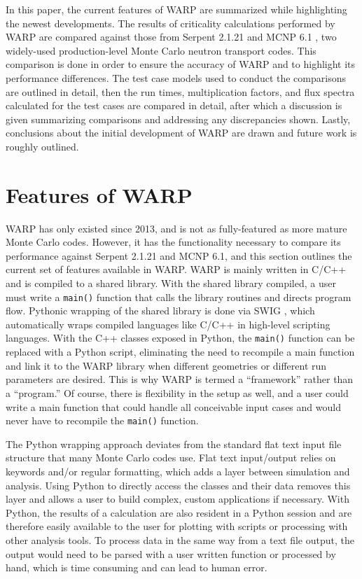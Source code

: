 \documentclass[preprint,12pt]{elsarticle}
\begin{document}
In this paper, the current features of WARP are summarized while highlighting the newest developments.  The results of criticality calculations performed by WARP are compared against those from Serpent 2.1.21 \cite{jaakko,serpent} and MCNP 6.1 \cite{mcnp6}, two widely-used production-level Monte Carlo neutron transport codes.   This comparison is done in order to ensure the accuracy of WARP and to highlight its performance differences.  The test case models used to conduct the comparisons are outlined in detail, then the run times, multiplication factors, and flux spectra calculated for the test cases are compared in detail, after which a discussion is given summarizing comparisons and addressing any discrepancies shown.  Lastly, conclusions about the initial development of WARP are drawn and future work is roughly outlined.

\section{Features of WARP}
\label{sec:features}

WARP has only existed since 2013, and is not as fully-featured as more mature Monte Carlo codes.  However, it has the functionality necessary to compare its performance against Serpent 2.1.21 and MCNP 6.1, and this section outlines the current set of features available in WARP.  WARP is mainly written in C/C++ and is compiled to a shared library.  With the shared library compiled, a user must write a \texttt{main()} function that calls the library routines and directs program flow.  Pythonic wrapping of the shared library is done via SWIG \cite{swig}, which automatically wraps compiled languages like C/C++ in high-level scripting languages.  With the C++ classes exposed in Python, the \texttt{main()} function can be replaced with a Python script, eliminating the need to recompile a main function and link it to the WARP library when different geometries or different run parameters are desired.  This is why WARP is termed a ``framework'' rather than a ``program.''  Of course, there is flexibility in the setup as well, and a user could write a main function that could handle all conceivable input cases and would never have to recompile the \texttt{main()} function.  

The Python wrapping approach deviates from the standard flat text input file structure that many Monte Carlo codes use.  Flat text input/output relies on keywords  and/or regular formatting, which adds a layer between simulation and analysis.  Using Python to directly access the classes and their data removes this layer and allows a user to build complex, custom applications if necessary.  With Python, the results of a calculation are also resident in a Python session and are therefore easily available to the user for plotting with scripts or processing with other analysis tools.  To process data in the same way from a text file output, the output would need to be parsed with a user written function or processed by hand, which is time consuming and can lead to human error.
\end{document}
